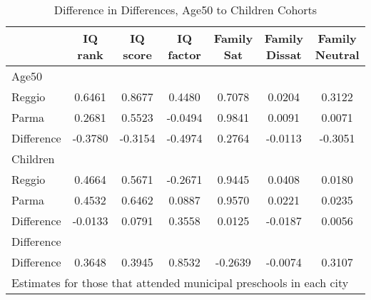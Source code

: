 \begin{table}[htbp]\centering
\caption{Difference in Differences, Age50 to Children Cohorts}
\begin{tabular}{l*{6}{c}}
\hline\hline
            &     IQ rank&    IQ score&   IQ factor&  Family Sat&Family Dissat&Family Neutral\\
\hline
Age50       &            &            &            &            &            &            \\
Reggio      &      0.6461&      0.8677&      0.4480&      0.7078&      0.0204&      0.3122\\
Parma       &      0.2681&      0.5523&     -0.0494&      0.9841&      0.0091&      0.0071\\
Difference  &     -0.3780&     -0.3154&     -0.4974&      0.2764&     -0.0113&     -0.3051\\
\hline
Children    &            &            &            &            &            &            \\
Reggio      &      0.4664&      0.5671&     -0.2671&      0.9445&      0.0408&      0.0180\\
Parma       &      0.4532&      0.6462&      0.0887&      0.9570&      0.0221&      0.0235\\
Difference  &     -0.0133&      0.0791&      0.3558&      0.0125&     -0.0187&      0.0056\\
\hline
Difference  &            &            &            &            &            &            \\
Difference  &      0.3648&      0.3945&      0.8532&     -0.2639&     -0.0074&      0.3107\\
\hline\hline
\multicolumn{7}{l}{\footnotesize Estimates for those that attended municipal preschools in each city}\\
\end{tabular}
\end{table}
